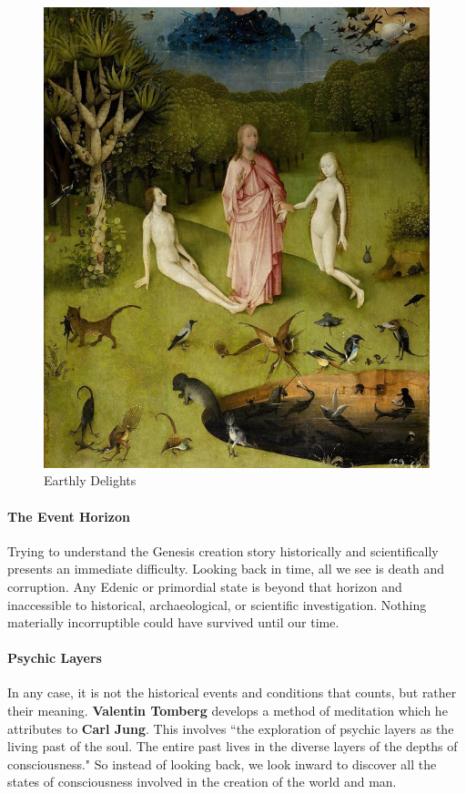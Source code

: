 \begin{figure}
\includegraphics[scale=.3]{a20140926TheEdenicState-img001.jpg}
\caption{Earthly Delights}
\end{figure}

\paragraph{The Event Horizon}
Trying to understand the Genesis creation story historically and scientifically presents an immediate difficulty. Looking back in time, all we see is death and corruption. Any Edenic or primordial state is beyond that horizon and inaccessible to historical, archaeological, or scientific investigation. Nothing materially incorruptible could have survived until our time.

\paragraph{Psychic Layers}
In any case, it is not the historical events and conditions that counts, but rather their meaning. \textbf{Valentin Tomberg} develops a method of meditation which he attributes to \textbf{Carl Jung}. This involves ``the exploration of psychic layers as the living past of the soul. The entire past lives in the diverse layers of the depths of consciousness." So instead of looking back, we look inward to discover all the states of consciousness involved in the creation of the world and man.

